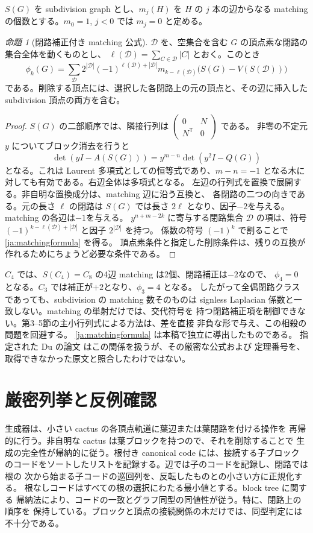 \documentclass[12pt]{amsart}
\theoremstyle{definition}
\theoremstyle{remark}
\numberwithin{equation}{section}
\newcommand{\N}{\mathbb{N}}
\newtheorem{jprop}[thm]{命題}
\begin{document}
$S(G)$ を subdivision graph とし、$m_j(H)$ を $H$ の $j$ 本の辺からなる
matching の個数とする。$m_0=1$, $j<0$ では $m_j=0$ と定める。

\begin{jprop}[閉路補正付き matching 公式]\label{ja:matching}
$\mathscr D$ を、空集合を含む $G$ の頂点素な閉路の集合全体を動くものとし、
$\ell(\mathscr D)=\sum_{C\in\mathscr D}|C|$ とおく。このとき
\begin{equation}\label{ja:matchingformula}
 \phi_k(G)=\sum_{\mathscr D}
 2^{|\mathscr D|}(-1)^{\ell(\mathscr D)+|\mathscr D|}
 m_{k-\ell(\mathscr D)}\bigl(S(G)-V(S(\mathscr D))\bigr)
\end{equation}
である。削除する頂点には、選択した各閉路上の元の頂点と、その辺に挿入した
subdivision 頂点の両方を含む。
\end{jprop}
\begin{proof}
$S(G)$ の二部順序では、隣接行列は
$\left(\begin{smallmatrix}0&N\\N^{\mathsf T}&0\end{smallmatrix}\right)$ である。
非零の不定元 $y$ についてブロック消去を行うと
\[
 \det(yI-A(S(G)))=y^{m-n}\det(y^2I-Q(G))
\]
となる。これは Laurent 多項式としての恒等式であり、$m-n=-1$ となる木に
対しても有効である。右辺全体は多項式となる。
左辺の行列式を置換で展開する。非自明な置換成分は、matching 辺に沿う互換と、
各閉路の二つの向きである。元の長さ $\ell$ の閉路は $S(G)$ では長さ
$2\ell$ となり、因子$-2$を与える。matching の各辺は$-1$を与える。
$y^{n+m-2k}$ に寄与する閉路集合 $\mathscr D$ の項は、符号
$(-1)^{k-\ell(\mathscr D)+|\mathscr D|}$ と因子 $2^{|\mathscr D|}$ を持つ。
係数の符号 $(-1)^k$ で割ることで \eqref{ja:matchingformula} を得る。
頂点素条件と指定した削除条件は、残りの互換が作れるためにちょうど必要な条件である。
\end{proof}

$C_4$ では、$S(C_4)=C_8$ の4辺 matching は2個、閉路補正は$-2$なので、
$\phi_4=0$ となる。$C_3$ では補正が$+2$となり、$\phi_3=4$ となる。
したがって全偶閉路クラスであっても、subdivision の matching 数そのものは
signless Laplacian 係数と一致しない。matching の単射だけでは、交代符号を
持つ閉路補正項を制御できない。第3--5節の主小行列式による方法は、差を直接
非負な形で与え、この相殺の問題を回避する。
\eqref{ja:matchingformula} は本稿で独立に導出したものである。
指定された Du の論文 \cite{ja-du} はこの関係を扱うが、その厳密な公式および
定理番号を、取得できなかった原文と照合したわけではない。

\section{厳密列挙と反例確認}
生成器は、小さい cactus の各頂点軌道に葉辺または葉閉路を付ける操作を
再帰的に行う。非自明な cactus は葉ブロックを持つので、それを削除することで
生成の完全性が帰納的に従う。根付き canonical code には、接続する子ブロック
のコードをソートしたリストを記録する。辺では子のコードを記録し、閉路では根の
次から始まる子コードの巡回列を、反転したものとの小さい方に正規化する。
根なしコードはすべての根の選択にわたる最小値とする。block tree に関する
帰納法により、コードの一致とグラフ同型の同値性が従う。特に、閉路上の順序を
保持している。ブロックと頂点の接続関係の木だけでは、同型判定には不十分である。
\end{document}
